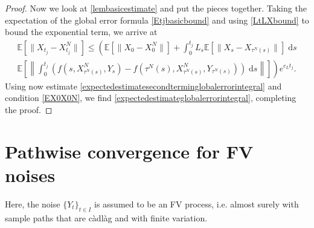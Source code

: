 \documentclass[reqno,12pt]{amsart}
\theoremstyle{plain} %
\theoremstyle{definition} %
\begin{document}
\begin{proof}
    Now we look at \cref{lembasicestimate} and put the pieces together. Taking the expectation of the global error formula \eqref{Etjbasicbound} and using \eqref{LtLXbound} to bound the exponential term, we arrive at
    \begin{multline*}
        \mathbb{E}\left[\|X_{t_j} - X_{t_j}^N\|\right] \leq \left( \mathbb{E}\left[\|X_0 - X_0^N\|\right] + \int_0^{t_j} L_s \mathbb{E}\left[\|X_s - X_{\tau^N(s)}\|\right] \;\mathrm{d}s \right. \\
        \left. \mathbb{E}\left[\left\|\int_0^{t_j} \left( f(s, X_{\tau^N(s)}^N, Y_s) - f(\tau^N(s), X_{\tau^N(s)}^N, Y_{\tau^N(s)}) \right)\;\mathrm{d}s\right\|\right]\right) e^{c_L t_j}.
    \end{multline*}
    Using now estimate \eqref{expectedestimatesecondterminglobalerrorintegral} and condition \eqref{EX0X0N}, we find \eqref{expectedestimateglobalerrorintegral}, completing the proof.
\end{proof}

\section{Pathwise convergence for FV noises}
\label{secmonotonicbound}

Here, the noise $\{Y_t\}_{t\in I}$ is assumed to be an FV process, i.e. almost surely with sample paths that are c\`adl\`ag and with finite variation.
\end{document}
